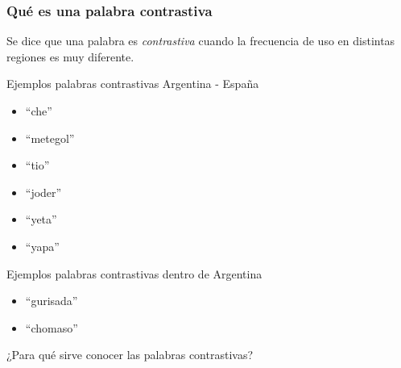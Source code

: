 
\begin{frame}[t]\frametitle{Qué es una palabra contrastiva}
    
    Se dice que una palabra es \textit{contrastiva} cuando la frecuencia de uso en distintas regiones es muy diferente. 

    \begin{block}{Ejemplos palabras contrastivas Argentina - España}
    
    \begin{multicols}{3}
    \begin{itemize}
      \item ``che''
      \item ``metegol''
      \item ``tio''
      \item ``joder''
       \item ``yeta''
      \item ``yapa''
    \end{itemize}
  \end{multicols}

    \end{block}

    \begin{block}{Ejemplos palabras contrastivas dentro de Argentina}
     \begin{multicols}{2}
    \begin{itemize}
      \item ``gurisada''
      \item ``chomaso''
    \end{itemize}
  \end{multicols}

    \end{block}
    \medskip

    ¿Para qué sirve conocer las palabras contrastivas?

\end{frame}

     

